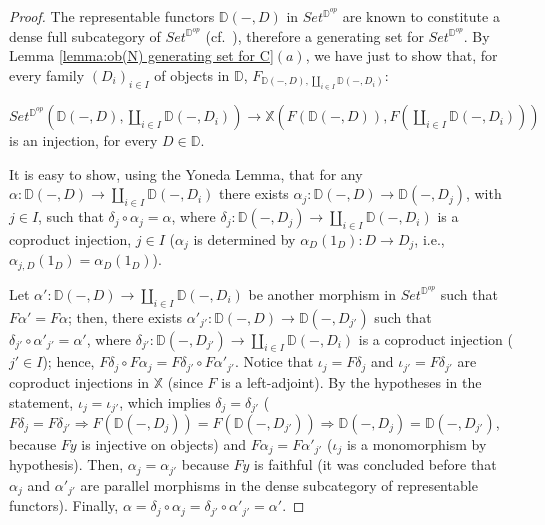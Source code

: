 \documentclass[12pt,a4paper]{amsart}
\theoremstyle{definition}
\begin{document}
\begin{proof}
  The representable functors $\mathbb{D}(-,D)$ in $Set^{\mathbb{D}^{op}}$ are known to constitute a dense full subcategory of $Set^{\mathbb{D}^{op}}$ (cf.\ \cite[Theorem 1 in \S III.7]{SM:cat}), therefore a generating set for $Set^{\mathbb{D}^{op}}$. By Lemma \ref{lemma:ob(N) generating set for C}$(a)$, we have just to show that, for every family $(D_i)_{i\in I}$ of objects in $\mathbb{D}$, $F_{\mathbb{D}(-,D),\coprod_{i\in I}\mathbb{D}(-,D_i)}:$

 $Set^{\mathbb{D}^{op}}(\mathbb{D}(-,D),\coprod_{i\in I}\mathbb{D}(-,D_i))\rightarrow \mathbb{X}(F(\mathbb{D}(-,D)),F(\coprod_{i\in I}\mathbb{D}(-,D_i)))$ is an injection, for every $D\in\mathbb{D}$.\vspace{3pt}

It is easy to show, using the Yoneda Lemma, that for any $\alpha :\mathbb{D}(-,D)\rightarrow\coprod_{i\in I}\mathbb{D}(-,D_i)$ there exists $\alpha_j:\mathbb{D}(-,D)\rightarrow\mathbb{D}(-,D_j)$, with $j\in I$, such that $\delta_j\circ\alpha_j=\alpha$, where $\delta_j:\mathbb{D}(-,D_j)\rightarrow\coprod_{i\in I}\mathbb{D}(-,D_i)$ is a coproduct injection, $j\in I$ ($\alpha_j$ is determined by $\alpha_D(1_D):D\rightarrow D_j$, i.e., $\alpha_{j,D}(1_D)=\alpha_D(1_D)$).\vspace{3pt}

Let $\alpha' :\mathbb{D}(-,D)\rightarrow\coprod_{i\in I}\mathbb{D}(-,D_i)$ be another morphism in $Set^{\mathbb{D}^{op}}$ such that $F\alpha'=F\alpha$; then, there exists $\alpha'_{j'}:\mathbb{D}(-,D)\rightarrow\mathbb{D}(-,D_{j'})$ such that $\delta_{j'}\circ\alpha'_{j'}=\alpha'$, where $\delta_{j'}:\mathbb{D}(-,D_{j'})\rightarrow\coprod_{i\in I}\mathbb{D}(-,D_i)$ is a coproduct injection ($j'\in I$); hence, $F\delta_j\circ F\alpha_j=F\delta_{j'}\circ F\alpha'_{j'}$. Notice that $\iota_j=F\delta_j$ and $\iota_{j'}=F\delta_{j'}$ are coproduct injections in $\mathbb{X}$ (since $F$ is a left-adjoint). By the hypotheses in the statement, $\iota_j=\iota_{j'}$, which implies $\delta_j=\delta_{j'}$ ($F\delta_j=F\delta_{j'}\Rightarrow F(\mathbb{D}(-,D_j))=F(\mathbb{D}(-,D_{j'}))\Rightarrow\mathbb{D}(-,D_j)=\mathbb{D}(-,D_{j'})$, because $Fy$ is injective on objects) and $F\alpha_j=F\alpha'_{j'}$ ($\iota_j$ is a monomorphism by hypothesis). Then, $\alpha_j=\alpha_{j'}$ because $Fy$ is faithful (it was concluded before that $\alpha_j$ and $\alpha'_{j'}$ are parallel morphisms in the dense subcategory of representable functors). Finally, $\alpha=\delta_j\circ\alpha_j=\delta_{j'}\circ\alpha'_{j'}=\alpha'$.\end{proof}
\end{document}
